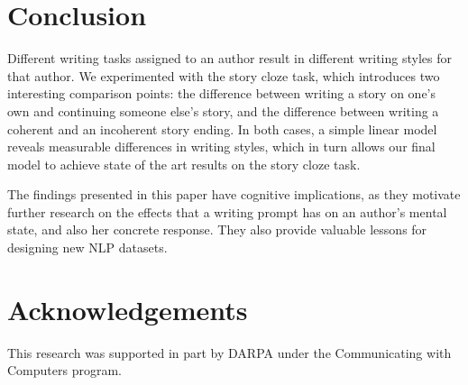 \documentclass[11pt,a4paper]{article}
\newcommand{\isectionb}[1]{\section{#1}\label{ssec:#1}}
\begin{document}
\isectionb{Conclusion}

Different writing tasks assigned to an author result in different
writing styles for that author.
We experimented with the story cloze task, which introduces two interesting comparison points: 
 the difference between writing a story on one's own and continuing someone else's story,
 and the difference between writing a coherent and an incoherent story ending.
In both cases, a simple linear model reveals measurable differences in writing styles, 
which in turn allows our final 
model to achieve state of the art results on the story cloze task.

The findings presented in this paper have  cognitive implications, as
they motivate further research on the effects that a writing
prompt has on an author's mental state, and also her concrete response.
They also provide valuable lessons for designing new NLP datasets.

\section{Acknowledgements}
This research was supported in part by DARPA under the Communicating with Computers program.




\end{document}
